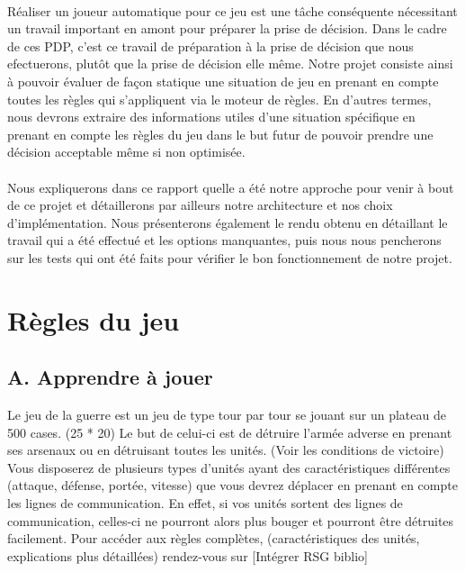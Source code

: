\documentclass[12pt]{article}
\begin{document}
	\paragraph{}
	Réaliser un joueur automatique pour ce jeu est une tâche conséquente nécessitant un travail important en amont pour préparer la prise de décision.
	Dans le cadre de ces PDP, c'est ce travail de préparation à la prise de décision que nous efectuerons, plutôt que la prise de décision elle même.
	Notre projet consiste ainsi à pouvoir évaluer de façon statique une situation de jeu en prenant en compte toutes les règles qui s'appliquent via le moteur de règles.
	En d'autres termes, nous devrons extraire des informations utiles d'une situation spécifique en prenant en compte les règles du jeu dans le but futur de pouvoir prendre une décision acceptable même si non optimisée.
	
	\paragraph{}
	Nous expliquerons dans ce rapport quelle a été notre approche pour venir à bout de ce projet et détaillerons par ailleurs notre architecture et nos
	choix d'implémentation. Nous présenterons également le rendu obtenu en détaillant le travail qui a été effectué et les options manquantes, puis
	nous nous pencherons sur les tests qui ont été faits pour vérifier le bon fonctionnement de notre projet.
	
	\clearpage
	
	\section{Règles du jeu}    

		\subsection{A. Apprendre à jouer}
		
		Le jeu de la guerre est un jeu de type tour par tour se jouant sur un plateau de 500 cases. (25 * 20)
		Le but de celui-ci est de détruire l'armée adverse en prenant ses arsenaux ou en détruisant toutes les unités. (Voir les conditions de victoire)
		Vous disposerez de plusieurs types d'unités ayant des caractéristiques différentes (attaque, défense, portée, vitesse) que vous devrez déplacer 
		en prenant en compte les lignes de communication.
		En effet, si vos unités sortent des lignes de communication, celles-ci ne pourront alors plus bouger et pourront être détruites facilement.
		Pour accéder aux règles complètes, (caractéristiques des unités, explications plus détaillées) rendez-vous sur [Intégrer RSG biblio]
		
\end{document}
